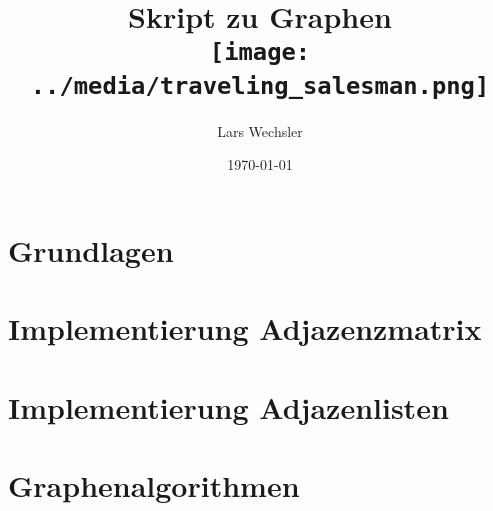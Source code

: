 \documentclass{article}
\author{Lars Wechsler}
\title{Skript zu Graphen \\ \centering\texttt{[image: ../media/traveling\_salesman.png]}}
\date{\today}
\begin{document}
\maketitle
\newpage
\tableofcontents
\newpage 

\section{Grundlagen}



\newpage

\section{Implementierung Adjazenzmatrix}


\newpage

\section{Implementierung Adjazenlisten}


\newpage 

\section{Graphenalgorithmen}

\end{document}
